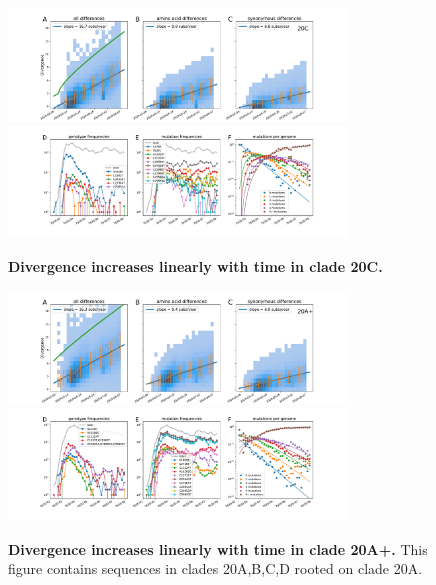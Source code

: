 \begin{figure}[h]
    \includegraphics[width=0.8\textwidth]{figures/rtt/20C_rtt.pdf}
    \includegraphics[width=0.8\textwidth]{figures/counts/20C_counts.pdf}
    \caption{{\bf Divergence increases linearly with time in clade 20C.}
    \label{fig:20C_divergence}}
\end{figure}


\begin{figure}[h]
    \includegraphics[width=0.8\textwidth]{figures/rtt/20A+_rtt.pdf}
    \includegraphics[width=0.8\textwidth]{figures/counts/20A+_counts.pdf}
    \caption{{\bf Divergence increases linearly with time in clade 20A+.}
    This figure contains sequences in clades 20A,B,C,D rooted on clade 20A.
    \label{fig:20A+_divergence}}
\end{figure}



